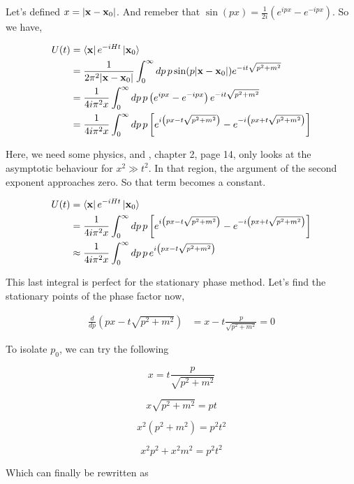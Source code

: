 Let's defined $x = \left| \boldsymbol{\mathbf{x}}-\boldsymbol{\mathbf{x}}_0 \right|$.
And remeber that $\sin\left(px\right) = \frac{1}{2i} \left(e^{ipx} - e^{-ipx}\right)$.
So we have,

\begin{align}
U(t) &= \bra{\boldsymbol{\mathbf{x}}} e^{-iHt} \ket{\boldsymbol{\mathbf{x}}_0} \\
&= \frac{1}{2\pi^2 |\boldsymbol{\mathbf{x}}-\boldsymbol{\mathbf{x}}_0|}
    \int_{0}^{\infty} dp \, p \sin(p|\boldsymbol{\mathbf{x}}-\boldsymbol{\mathbf{x}}_0|) e^{-it\sqrt{p^2 + m^2}}  \\
&= \frac{1}{4i \pi^2 x}
    \int_{0}^{\infty} dp \, p \left(e^{ipx} - e^{-ipx}\right) e^{-it\sqrt{p^2 + m^2}} \\
&= \frac{1}{4i \pi^2 x}
    \int_{0}^{\infty} dp \, p
    \left[ e^{i \left(px - t\sqrt{p^2 + m^2}\right)} - e^{-i \left(px + t\sqrt{p^2 + m^2}\right)} \right]
\end{align}

Here, we need some physics, and \cite{peskin-and-schroeder}, chapter 2, page 14, only looks at the asymptotic behaviour
for $x^2 \gg t^2$.
In that region, the argument of the second exponent approaches zero.
So that term becomes a constant.

\begin{align}
U(t) &= \bra{\boldsymbol{\mathbf{x}}} e^{-iHt} \ket{\boldsymbol{\mathbf{x}}_0} \\
&= \frac{1}{4i \pi^2 x}
    \int_{0}^{\infty} dp \, p
    \left[ e^{i \left(px - t\sqrt{p^2 + m^2}\right)} - e^{-i \left(px + t\sqrt{p^2 + m^2}\right)} \right] \\
&\approx \frac{1}{4i \pi^2 x}
    \int_{0}^{\infty} dp \, p \,
    e^{i \left(px - t\sqrt{p^2 + m^2}\right)}
\end{align}

This last integral is perfect for the stationary phase method.
Let's find the stationary points of the phase factor now,

\begin{align*}
\frac{d}{dp} \left( px - t\sqrt{p^2 + m^2} \right) &= x - t\frac{p}{\sqrt{p^2 + m^2}} = 0
\end{align*}

To isolate $p_0$, we can try the following

$$
x = t\frac{p}{\sqrt{p^2 + m^2}}
$$

$$
x \sqrt{p^2 + m^2} = pt
$$

$$
x^2 \left( p^2 + m^2 \right) = p^2 t^2
$$

$$
x^2 p^2 + x^2 m^2 = p^2 t^2
$$

Which can finally be rewritten as

